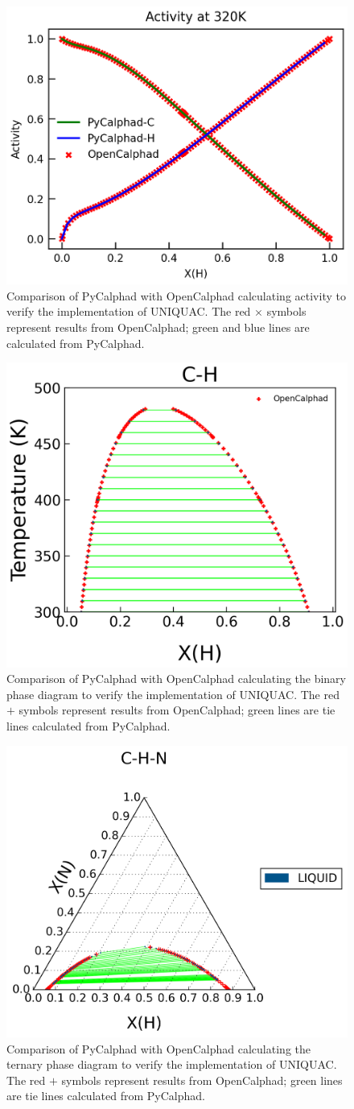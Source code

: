 \begin{figure}[H]
    \centering
    \includegraphics[width=0.5\linewidth]{models/Models-UQC-Activity.png}
    \caption{Comparison of PyCalphad with OpenCalphad calculating activity to verify the implementation of UNIQUAC. The red $\times$ symbols represent results from OpenCalphad; green and blue lines are calculated from PyCalphad.}
    \label{models:fig:UQCacr}
\end{figure}

\begin{figure}[H]
    \centering
    \includegraphics[width=0.5\linewidth]{models/Models-UQC-BinaryPD.png}
    \caption{Comparison of PyCalphad with OpenCalphad calculating the binary phase diagram to verify the implementation of UNIQUAC. The red $+$ symbols represent results from OpenCalphad; green lines are tie lines calculated from PyCalphad.}
    \label{models:fig:UQCBinary}
\end{figure}

\begin{figure}[H]
    \centering
    \includegraphics[width=0.5\linewidth]{models/Models-UQC-TernaryPD.png}
    \caption{Comparison of PyCalphad with OpenCalphad calculating the ternary phase diagram to verify the implementation of UNIQUAC. The red $+$ symbols represent results from OpenCalphad; green lines are tie lines calculated from PyCalphad.}
    \label{models:fig:UQCTernary}
\end{figure}

